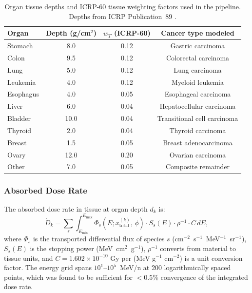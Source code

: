 \begin{table}[H]
  \centering
  \caption{Organ tissue depths and ICRP-60 tissue weighting factors used in
           the pipeline. Depths from ICRP Publication~89 \citep{icrp89}.}
  \label{tab:organ_depths}
  \begin{tabular}{lccc}
    \toprule
    Organ & Depth (g/cm$^2$) & $w_T$ (ICRP-60) & Cancer type modeled \\
    \midrule
    Stomach    & 8.0  & 0.12 & Gastric carcinoma \\
    Colon      & 9.5  & 0.12 & Colorectal carcinoma \\
    Lung       & 5.0  & 0.12 & Lung carcinoma \\
    Leukemia   & 4.0  & 0.12 & Myeloid leukemia \\
    Esophagus  & 4.0  & 0.05 & Esophageal carcinoma \\
    Liver      & 6.0  & 0.04 & Hepatocellular carcinoma \\
    Bladder    & 10.0 & 0.04 & Transitional cell carcinoma \\
    Thyroid    & 2.0  & 0.04 & Thyroid carcinoma \\
    Breast     & 1.5  & 0.05 & Breast adenocarcinoma \\
    Ovary      & 12.0 & 0.20 & Ovarian carcinoma \\
    Other      & 7.0  & 0.05 & Composite remainder \\
    \bottomrule
  \end{tabular}
\end{table}

\subsubsection{Absorbed Dose Rate}
\label{sec:doserate}

The absorbed dose rate in tissue at organ depth $d_k$ is:
\begin{equation}
  \dot{D}_k = \sum_s \int_{E_\mathrm{min}}^{E_\mathrm{max}}
    \Phi_s(E; x_\mathrm{total}^{(k)},\, \phi)
    \cdot S_s(E) \cdot \rho^{-1} \cdot C
    \,dE,
  \label{eq:doserate}
\end{equation}
where $\Phi_s$ is the transported differential flux of species $s$
(cm$^{-2}$~s$^{-1}$~MeV$^{-1}$~sr$^{-1}$),
$S_s(E)$ is the stopping power (MeV~cm$^2$~g$^{-1}$),
$\rho^{-1}$ converts from material to tissue units,
and $C = 1.602 \times 10^{-10}$ Gy per (MeV g$^{-1}$ cm$^{-2}$) is a unit
conversion factor.
The energy grid spans $10^1$--$10^5$~MeV/n at 200 logarithmically spaced points,
which was found to be sufficient for $<0.5\%$ convergence of the integrated dose rate.

